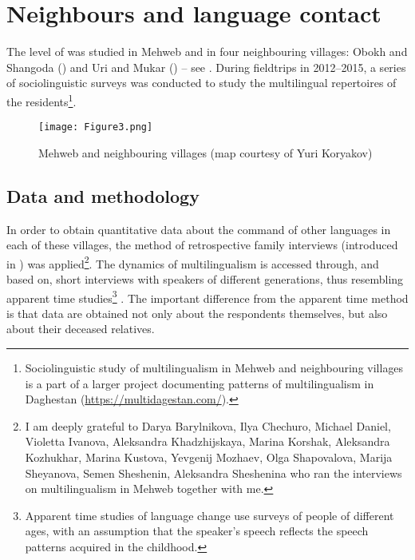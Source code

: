\documentclass[output=paper]{langsci/langscibook}
\begin{document}
\section{Neighbours and language contact}\label{neighbours-and-language-contact}

The level of  was studied in Mehweb and in four
neighbouring villages: Obokh and Shangoda () and Uri and Mukar ()
– see . During fieldtrips in 2012–2015, a series of
sociolinguistic surveys was conducted to study the multilingual
repertoires of the residents\footnote{Sociolinguistic study of
  multilingualism in Mehweb and neighbouring villages is a part of a
  larger project documenting patterns of multilingualism in Daghestan
  (\url{https://multidagestan.com/}).}.

\begin{figure}
\texttt{[image: Figure3.png]}

\caption{Mehweb and neighbouring villages (map courtesy of Yuri Koryakov)}
\label{Figure1}
\end{figure}

\subsection{Data and methodology}\label{data-and-method}

In order to obtain quantitative data about the command of other
languages in each of these villages, the method of retrospective family
interviews (introduced in \citealt{dobrushina2013}) was applied\footnote{I am
  deeply grateful to Darya Barylnikova, Ilya Chechuro, Michael Daniel,
  Violetta Ivanova, Aleksandra Khadzhijskaya, Marina Korshak, Aleksandra
  Kozhukhar, Marina Kustova, Yevgenij Mozhaev, Olga Shapovalova, Marija
  Sheyanova, Semen Sheshenin, Aleksandra Sheshenina who ran the
  interviews on multilingualism in Mehweb together with me.}. The
dynamics of multilingualism is accessed through, and based on, short interviews with speakers of different generations, thus resembling
apparent time studies\footnote{Apparent time studies of language change
  use surveys of people of different ages, with an assumption that the
  speaker's speech reflects the speech patterns acquired in the
  childhood.} \citep{bailey2013}. The important difference from the apparent
time method is that data are obtained not only about the respondents
themselves, but also about their deceased relatives.
\end{document}
